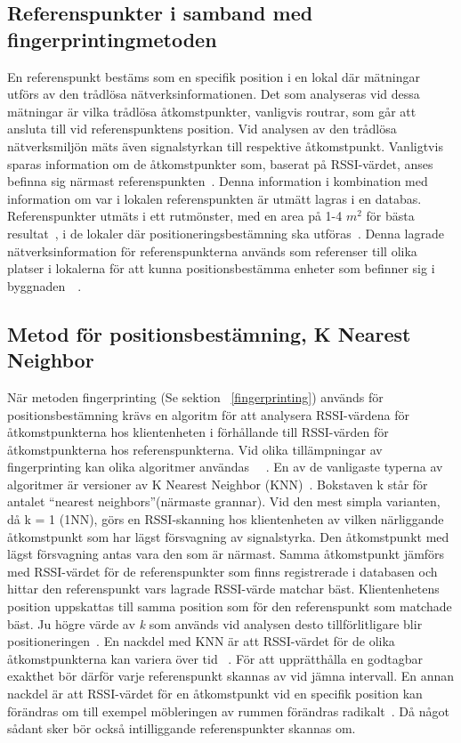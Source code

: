 \documentclass[a4paper,12pt]{article}
\begin{document}
 \subsection{Referenspunkter i samband med fingerprintingmetoden}\label{referenspunkter}
 En referenspunkt bestäms som en specifik position i en lokal där mätningar utförs av den trådlösa nätverksinformationen. Det som analyseras vid dessa mätningar är vilka trådlösa åtkomstpunkter, vanligvis routrar, som går att ansluta till vid referenspunktens position. Vid analysen av den trådlösa nätverksmiljön mäts även signalstyrkan till respektive åtkomstpunkt. Vanligtvis sparas information om de åtkomstpunkter som, baserat på RSSI-värdet, anses befinna sig närmast referenspunkten~\cite{IP1}. Denna information i kombination med information om var i lokalen referenspunkten är utmätt lagras i en databas. Referenspunkter utmäts i ett rutmönster, med en area på 1-4 $m^2$ för bästa resultat~\cite{yiu2017wireless}, i de lokaler där positioneringsbestämning ska utföras~\cite{IP1}. Denna lagrade nätverksinformation för referenspunkterna används som referenser till olika platser i lokalerna för att kunna positionsbestämma enheter som befinner sig i byggnaden~\cite{yiu2017wireless}~\cite{IP1}.


 \subsection{Metod för positionsbestämning, K Nearest Neighbor}\label{KNN}
 När metoden fingerprinting (Se sektion ~\ref{fingerprinting}) används för positionsbestämning krävs en algoritm för att analysera RSSI-värdena för åtkomstpunkterna hos klientenheten i förhållande till RSSI-värden för åtkomstpunkterna hos referenspunkterna. Vid olika tillämpningar av fingerprinting kan olika algoritmer användas ~\cite{tian2013fingerprint}~\cite{jun2018low}. En av de vanligaste typerna av algoritmer är versioner av K Nearest Neighbor (KNN)~\cite{tian2013fingerprint}.
 Bokstaven k står för antalet ``nearest neighbors''(närmaste grannar). Vid den mest simpla varianten, då k = 1 (1NN), görs en RSSI-skanning hos klientenheten av vilken närliggande åtkomstpunkt som har lägst försvagning av signalstyrka. Den åtkomstpunkt med lägst försvagning antas vara den som är närmast. Samma åtkomstpunkt jämförs med RSSI-värdet för de referenspunkter som finns registrerade i databasen och hittar den referenspunkt vars lagrade RSSI-värde matchar bäst. Klientenhetens position uppskattas till samma position som för den referenspunkt som matchade bäst.
 Ju högre värde av \textit{k} som används vid analysen desto tillförlitligare blir positioneringen~\cite{yiu2017wireless}.
 En nackdel med KNN är att RSSI-värdet för de olika åtkomstpunkterna kan variera över tid ~\cite{tian2013fingerprint}. För att upprätthålla en godtagbar exakthet bör därför varje referenspunkt skannas av vid jämna intervall.
 En annan nackdel är att RSSI-värdet för en åtkomstpunkt vid en specifik position kan förändras om till exempel möbleringen av rummen förändras radikalt~\cite{zanca2008experimental}. Då något sådant sker bör också intilliggande referenspunkter skannas om.
\end{document}
